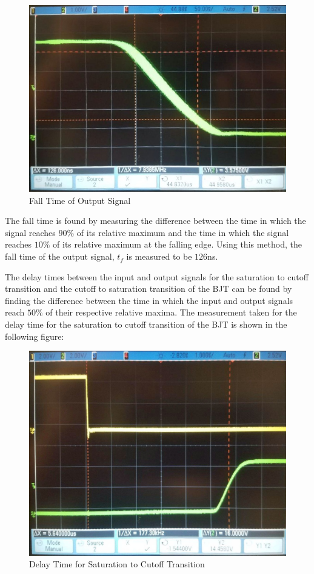 \FloatBarrier
\begin{figure}[h!]
	\centering
	\includegraphics[scale=0.34]{../images/inverter_tf.jpeg}
	\caption{Fall Time of Output Signal}
	\label{fig:inverter_tf}
\end{figure}
\FloatBarrier

The fall time is found by measuring the difference between the time in which the signal reaches $90\%$ of its relative maximum and the time in which the signal reaches $10\%$ of its relative maximum at the falling edge. Using this method, the fall time of the output signal, $t_f$ is measured to be $126$\si{\nano\second}.

The delay times between the input and output signals for the saturation to cutoff transition and the cutoff to saturation transition of the BJT can be found by finding the difference between the time in which the input and output signals reach $50\%$ of their respective relative maxima. The measurement taken for the delay time for the saturation to cutoff transition of the BJT is shown in the following figure:

\FloatBarrier
\begin{figure}[h!]
	\centering
	\includegraphics[scale=0.26]{../images/inverter_td.jpeg}
	\caption{Delay Time for Saturation to Cutoff Transition}
	\label{fig:inverter_td}
\end{figure}
\FloatBarrier

